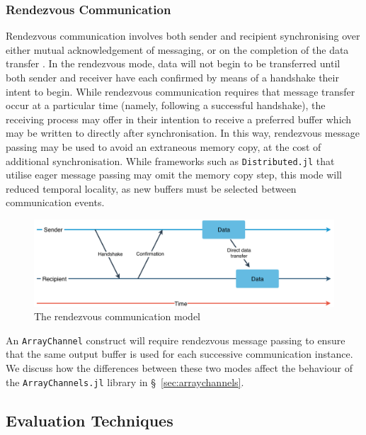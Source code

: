 \documentclass{juliacon}
\begin{document}
\subsubsection{Rendezvous Communication}
\label{sec:rendezvous}

Rendezvous communication involves both sender and recipient
synchronising over either mutual acknowledgement of messaging, or on the
completion of the data transfer \cite{illinois, ompi}. In the rendezvous
mode, data will not begin to be transferred until both sender and
receiver have each confirmed by means of a handshake their intent to
begin. While rendezvous communication requires that message transfer
occur at a particular time (namely, following a successful handshake),
the receiving process may offer in their intention to receive a preferred
buffer which may be written to directly after synchronisation. In this
way, rendezvous message passing may be used to avoid an extraneous
memory copy, at the cost of additional synchronisation. While frameworks such as \texttt{Distributed.jl} that utilise eager message passing may omit the memory copy step, this mode will reduced temporal locality, as new buffers must be selected between communication events.

\begin{figure}[htb]
	\includegraphics[width=\linewidth]{figs/Rendezvous.pdf}
	\caption{The rendezvous communication model}
	\label{fig:rendezvous}
\end{figure}

An \texttt{ArrayChannel} construct will require rendezvous message
passing to ensure that the same output buffer is used for each
successive communication instance. We discuss how the differences
between these two modes affect the behaviour of the
\texttt{ArrayChannels.jl} library in \S~\ref{sec:arraychannels}.

\subsection{Evaluation Techniques}
\label{sec:eval}
\end{document}
